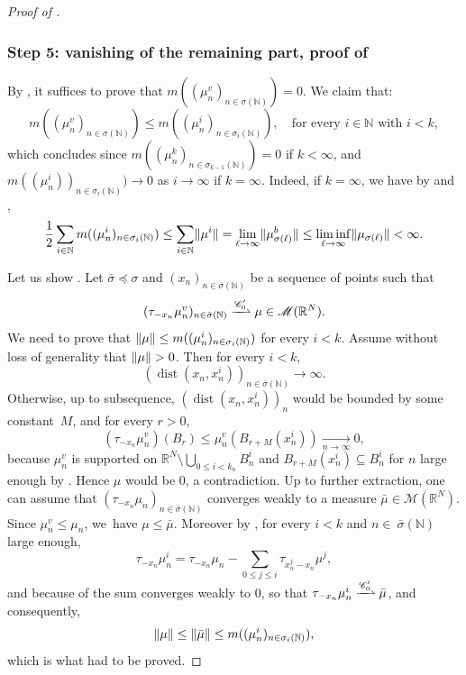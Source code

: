 \documentclass[11pt]{article}
\providecommand{\oldbigcup}{\bigcup}
\theoremstyle{plain}
\theoremstyle{definition}
\newcommand{\N}{\mathbb{N}}
\newcommand{\R}{\mathbb{R}}
\newcommand{\Cspace}{\mathscr{C}}
\newcommand{\Mspace}{\mathscr{M}}
\DeclarePairedDelimiter{\norm}{\lVert}{\rVert}
\DeclareMathOperator{\dist}{dist}
\newcommand{\mweakto}{\xrightharpoonup{\Cspace_0'}}
\newcommand{\xto}[2][]{\xrightarrow[#2]{#1}}
\numberwithin{equation}{section}
\begin{document}
\begin{proof}[Proof of ]
\subsubsection*{Step 5: vanishing of the remaining part, proof of }
By , it suffices to prove that \(m((\mu^v_n)_{n\in\sigma(\N)})=0\). We claim that:
\begin{equation}\label{bubbleConcentrationEstimate}
m((\mu^v_n)_{n\in\sigma(\N)})\le m((\mu^i_n)_{n\in\sigma_i(\N)}),\quad\text{for every \(i\in\N\) with \(i< k\)},
\end{equation}
which concludes since \(m((\mu^k_n)_{n\in\sigma_{k-1}(\N)})=0\) if \(k<\infty\), and \(m((\mu^i_n))_{n\in\sigma_i(\N)})\to 0\) as \(i\to\infty\) if \(k=\infty\). Indeed, if \(k=\infty\), we have by  and ,
\[
\frac 12\sum_{i\in\N}m((\mu^i_n)_{n\in\sigma_i(\N)})\le\sum_{i\in\N}\norm{\mu^i}= \lim_{\ell\to\infty} \norm{\mu_{\sigma(\ell)}^b} \leq \liminf_{\ell\to\infty}\norm{\mu_{\sigma(\ell)}}<\infty.
\]

Let us show . Let \(\bar\sigma\preceq\sigma\) and \((x_n)_{n\in\bar\sigma(\N)}\) be a sequence of points such that
\[
(\tau_{-x_n}\mu^v_n)_{n\in\bar\sigma(\N)}\mweakto \mu\in\Mspace(\R^N).
\]
We need to prove that \(\norm{\mu}\le m((\mu^i_n)_{n\in \sigma_i(\N)})\) for every $i <k$. Assume without loss of generality that \(\norm{\mu}>0\). Then for every \(i<k\),
\begin{equation}\label{distanceDiverge}
(\dist(x_n,x^i_n))_{n\in\bar\sigma(\N)}\to\infty.
\end{equation}
Otherwise, up to subsequence, $(\dist(x_n,x_n^i))_n$ would be bounded by some constant~$M$, and for every $r > 0$,
\[(\tau_{-x_n} \mu_n^v)(B_r) \leq \mu_n^v(B_{r+M}(x^i_n)) \xto{n\to\infty} 0,\]
because \(\mu^v_n\) is supported on \(\R^N\setminus\oldbigcup_{0\le i<k_n}B^i_n\) and $B_{r+M}(x^i_n) \subseteq B^i_n$ for $n$ large enough by . Hence \(\mu\) would be \(0\), a contradiction. Up to further extraction, one can assume that \((\tau_{-x_n}\mu_n)_{n\in\bar\sigma(\N)}\) converges weakly to a measure \(\bar\mu \in \Mspace(\R^N)\). Since \(\mu^v_n\le\mu_n\), we~have \(\mu\le\bar\mu\). Moreover by , for every \(i < k\) and \(n\in\ \bar\sigma(\N)\) large enough,
\[
\tau_{-x_n}\mu^i_n=\tau_{-x_n}\mu_n-\sum_{0\le j\leq i}\tau_{x^j_n-x_n}\mu^j,
\]
and because of  the sum converges weakly to $0$, so that $\tau_{-x_n} \mu_n^i \mweakto \bar \mu$, and consequently,
\[
\norm{\mu}\le\norm{\bar\mu}\le m((\mu^i_n)_{n\in\sigma_i(\N)}),
\]
which is what had to be proved.


\end{proof}
\end{document}

